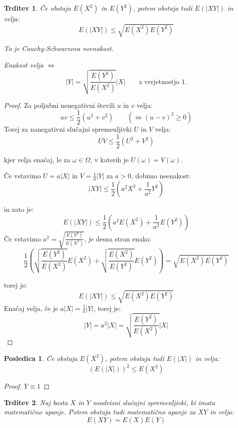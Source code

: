 \documentclass[12pt]{book}
\def\n{\noindent}
\theoremstyle{definition}
\theoremstyle{plain}
\theoremstyle{plain}
\newtheorem{trditev}{Trditev}
\theoremstyle{plain}
\newtheorem{posledica}{Posledica}
\theoremstyle{remark}
\begin{document}
\begin{trditev}
    Če obstaja $E\left(X^2\right)$ in $E\left(Y^2\right)$, potem obstaja tudi $E(|X Y|)$ in velja: 
    $$
    E(|X Y|) \leq \sqrt{E\left(X^2\right) E\left(Y^2\right)}
    $$
    
    \n To je Cauchy-Schwarzova neenakost.

    Enakost velja $\iff$ 
    $$
    |Y|=\sqrt{\frac{E\left(Y^2\right)}{E\left(X^2\right)}} |X| \qquad \text{z verjetnostjo $1$.}
    $$ 
\end{trditev}

\begin{proof}
    Za poljubni nenegativni števili $u$ in $v$ velja: 
    $$
    u v \leq \frac{1}{2}\left(u^2+v^2\right) \qquad \left(\iff (u-v)^2 \geq 0 \right)
    $$
    Torej za nanegativni slučajni spremenljivki $U$ in $V$ velja:
    $$
    U V \leq \frac{1}{2}\left(U^2+V^2\right)
    $$

    kjer velja enačaj, le za $\omega \in \Omega$, v katerih je $U(\omega) = V(\omega)$.

    \n Če vstavimo $U=a|X|$ in $V=\frac{1}{a} |Y|$ za $a>0$, dobimo neenakost: 
    $$
    |X Y| \leq \frac{1}{2}\left(a^2 X^2+\frac{1}{a^2} Y^2\right)
    $$

    in zato je:
    $$
    E(|XY|) \leq \frac{1}{2}\left(a^2 E\left(X^2\right)+\frac{1}{a^2} E\left(Y^2\right)\right)
    $$  
    Če vstavimo $a^2=\sqrt{\frac{E\left(Y^2\right)}{E\left(X^2\right)}}$, je desna stran enaka: 
    $$
    \frac{1}{2}\left(\sqrt{\frac{E\left(Y^2\right)}{E\left(X^2\right)}}  E\left(X^2\right)+\sqrt{\frac{E\left(X^2\right)}{E\left(Y^2\right)}}  E\left(Y^2\right)\right) = \sqrt{E\left(X^2\right) E\left(Y^2\right)}
    $$

    torej je: 
    $$
    E(|X Y|) \leq \sqrt{E\left(X^2\right) E\left(Y^2\right)}
    $$
    Enačaj velja, če je $a |X|= \frac{1}{a}|Y|$, torej je:
    $$
    |Y|=a^2 |X|=\sqrt{\frac{E\left(Y^2\right)}{E\left(X^2\right)}} |X|
    $$
\end{proof}

\begin{posledica}
    Če obstaja $E\left(X^2\right)$, potem obstaja tudi $E(|X|)$ in velja:
    $$
    (E(|X|))^2 \leq E\left(X^2\right)
    $$
\end{posledica}

\begin{proof}
    $Y \equiv 1$
\end{proof}

\begin{trditev}
    Naj bosta $X$ in $Y$ neodvisni slučajni spremenljivki, ki imata matematično upanje. Potem obstaja tudi matematično upanje za $XY$ in velja: 
    $$
    E(X Y)=E(X) E(Y)
    $$
\end{trditev}
\end{document}
